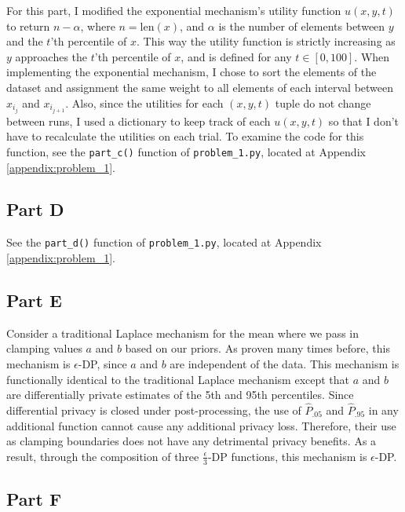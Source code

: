 \documentclass[12pt]{article}
\def\cl{\lstinline}
\begin{document}
For this part, I modified the exponential mechanism's utility function $u(x, y, t)$ to return $n - \alpha$, where $n = \text{len}(x)$, and $\alpha$ is the number of elements between $y$ and the $t$'th percentile of $x$. This way the utility function is strictly increasing as $y$ approaches the $t$'th percentile of $x$, and is defined for any $t \in [0, 100]$. When implementing the exponential mechanism, I chose to sort the elements of the dataset and assignment the same weight to all elements of each interval between $x_{i_j}$ and $x_{i_{j+1}}$. Also, since the utilities for each $(x, y, t)$ tuple do not change between runs, I used a dictionary to keep track of each $u(x, y, t)$ so that I don't have to recalculate the utilities on each trial. To examine the code for this function, see the \cl{part_c()} function of \cl{problem_1.py}, located at Appendix \ref{appendix:problem_1}.

\subsection{Part D}

\noindent

See the \cl{part_d()} function of \cl{problem_1.py}, located at Appendix \ref{appendix:problem_1}.

\subsection{Part E}

\noindent

Consider a traditional Laplace mechanism for the mean where we pass in clamping values $a$ and $b$ based on our priors. As proven many times before, this mechanism is $\epsilon$-DP, since $a$ and $b$ are independent of the data. This mechanism is functionally identical to the traditional Laplace mechanism except that $a$ and $b$ are differentially private estimates of the 5th and 95th percentiles. Since differential privacy is closed under post-processing, the use of $\hat{P}_{.05}$ and $\hat{P}_{.95}$ in any additional function cannot cause any additional privacy loss. Therefore, their use as clamping boundaries does not have any detrimental privacy benefits. As a result, through the composition of three $\frac{\epsilon}{3}$-DP functions, this mechanism is $\epsilon$-DP.

\subsection{Part F}
\end{document}
